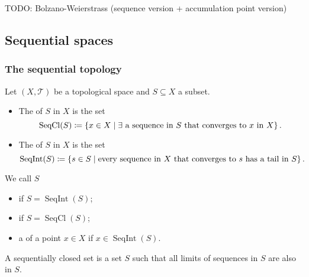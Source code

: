TODO: Bolzano-Weierstrass (sequence version + accumulation point version)

\subsection{Sequential spaces}
\subsubsection{The sequential topology}
\begin{definition}
Let $(X,\mathcal{T})$ be a topological space and $S\subseteq X$ a subset.
\begin{itemize}
\item The  of $S$ in $X$ is the set
\[ \operatorname{SeqCl}(S) \coloneqq \left\{ x\in X \;\middle|\; \text{$\exists$ a sequence in $S$ that converges to $x$ in $X$} \right\}. \]
\item The  of $S$ in $X$ is the set
\[ \operatorname{SeqInt}(S) \coloneqq \left\{ s\in S \;\middle|\; \text{every sequence in $X$ that converges to $s$ has a tail in $S$} \right\}. \]
\end{itemize}
We call $S$
\begin{itemize}
\item {} if $S = \operatorname{SeqInt}(S)$;
\item {} if $S = \operatorname{SeqCl}(S)$;
\item a  of a point $x\in X$ if $x\in \operatorname{SeqInt}(S)$.
\end{itemize}
\end{definition}
A sequentially closed set is a set $S$ such that all limits of sequences in $S$ are also in $S$.

